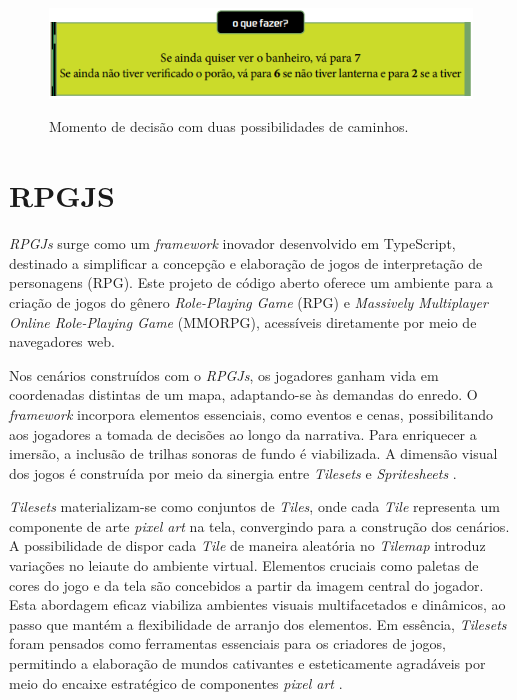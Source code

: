             \begin{figure}[h]
                \centering
                \caption{Momento de decisão com duas possibilidades de caminhos.}
                \includegraphics[scale=1]{Textuais/Pictures/Picture3.png}
                \label{fig:figure-3}
            \end{figure}
    
    \section{RPGJS}
         \textit{RPGJs} surge como um \textit{framework} inovador desenvolvido em TypeScript, destinado a simplificar a concepção e elaboração de jogos de interpretação de personagens (RPG). Este projeto de código aberto oferece um ambiente para a criação de jogos do gênero \textit{Role-Playing Game} (RPG) e \textit{Massively Multiplayer Online Role-Playing Game} (MMORPG), acessíveis diretamente por meio de navegadores web.

        Nos cenários construídos com o \textit{RPGJs}, os jogadores ganham vida em coordenadas distintas de um mapa, adaptando-se às demandas do enredo. O \textit{framework} incorpora elementos essenciais, como eventos e cenas, possibilitando aos jogadores a tomada de decisões ao longo da narrativa. Para enriquecer a imersão, a inclusão de trilhas sonoras de fundo é viabilizada. A dimensão visual dos jogos é construída por meio da sinergia entre \textit{Tilesets} e \textit{Spritesheets} \cite{Documentacao_RPGJs}.

        \textit{Tilesets} materializam-se como conjuntos de \textit{Tiles}, onde cada \textit{Tile} representa um componente de arte \textit{pixel art} na tela, convergindo para a construção dos cenários. A possibilidade de dispor cada \textit{Tile} de maneira aleatória no \textit{Tilemap} introduz variações no leiaute do ambiente virtual. Elementos cruciais como paletas de cores do jogo e da tela são concebidos a partir da imagem central do jogador. Esta abordagem eficaz viabiliza ambientes visuais multifacetados e dinâmicos, ao passo que mantém a flexibilidade de arranjo dos elementos. Em essência, \textit{Tilesets} foram pensados como ferramentas essenciais para os criadores de jogos, permitindo a elaboração de mundos cativantes e esteticamente agradáveis por meio do encaixe estratégico de componentes \textit{pixel art} \cite{borges2021desenvolvimento}.

